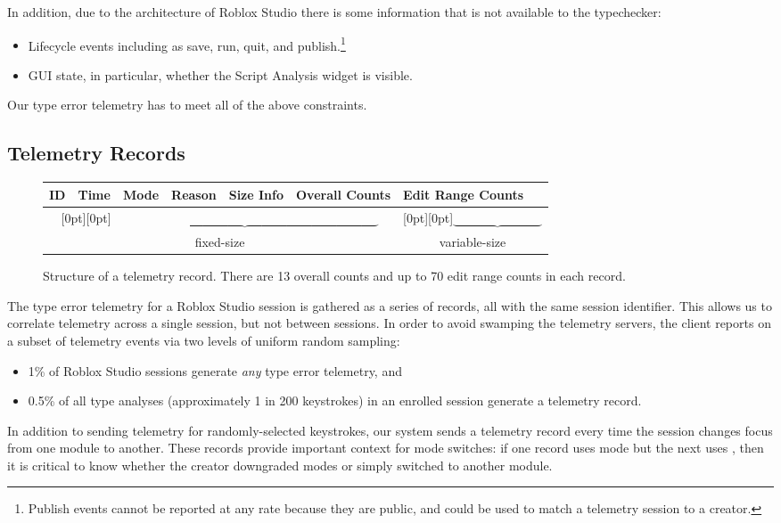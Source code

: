 \documentclass[english,submission,cleveref]{programming}
\begin{document}
In addition, due to the architecture of Roblox Studio
there is some information that is not available to the
typechecker:
\begin{itemize}
  \item
    Lifecycle events including as save, run, quit, and publish.\footnote{Publish events
    cannot be reported at any rate because they are public, and could be used
    to match a telemetry session to a creator.}
  \item
    GUI state, in particular, whether the Script Analysis widget is visible.
\end{itemize}
Our type error telemetry has to meet all of the above constraints.


\subsection{Telemetry Records}
\label{s:telemetry-records}

\begin{figure}[t]\centering
  \begin{tabular}{|l|l|l|l|l|l|l|}\hline
    ID & Time & Mode & Reason & Size Info & Overall Counts & Edit Range Counts
    \\\toprule
    \multicolumn{6}{c}{\raisebox{.5\normalbaselineskip}[0pt][0pt]{$\underbrace{\hspace{9cm}}$}} &
    \multicolumn{1}{c}{\raisebox{.5\normalbaselineskip}[0pt][0pt]{$\underbrace{\hspace{3cm}}$}} \\[-0.5ex]
    \multicolumn{6}{c}{fixed-size} & \multicolumn{1}{c}{variable-size}
  \end{tabular}
  \caption{Structure of a telemetry record. There are 13 overall counts and up to 70 edit range counts in each record.}
  \label{f:tdata}
\end{figure}

The type error telemetry for a Roblox Studio session is gathered as a series of
records, all with the same \panon{} session identifier.
This allows us to correlate telemetry across a single
session, but not between sessions.
In order to avoid swamping the telemetry servers, the client reports on a subset
of telemetry events via two levels of uniform random sampling:
\begin{itemize}
  \item
    1\% of Roblox Studio sessions generate \emph{any} type error telemetry, and
  \item
    0.5\% of all type analyses (approximately 1 in 200 keystrokes)
    in an enrolled session generate a telemetry record.
\end{itemize}
In addition to sending telemetry for randomly-selected keystrokes,
our system sends a telemetry record every time the session changes
focus from one module to another.
These records provide important context for mode switches:
if one record uses \mstrict{} mode but the next uses \mnocheck{},
then it is critical to know whether the creator downgraded modes
or simply switched to another module.
\end{document}

